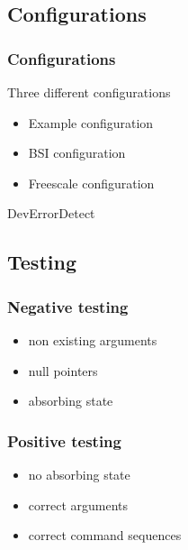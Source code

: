 \documentclass{beamer}
\begin{document}
\subsection{Configurations}

\begin{frame}
  \frametitle{Configurations}
  Three different configurations\\
  \begin{itemize}
    \item Example configuration
    \item BSI configuration
    \item Freescale configuration
  \end{itemize}
  DevErrorDetect
\end{frame}

\subsection{Testing}

\begin{frame}
  \frametitle{Negative testing}
  \begin{itemize}
    \item non existing arguments
    \item null pointers
    \item absorbing state
  \end{itemize}
\end{frame}


\begin{frame}
  \frametitle{Positive testing}
  \begin{itemize}
    \item no absorbing state
    \item correct arguments
    \item correct command sequences
  \end{itemize}
\end{frame}
\end{document}
